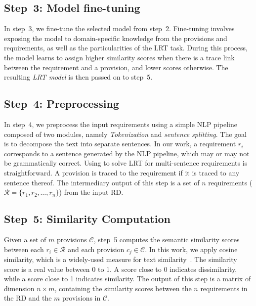 \subsection*{Step~3: Model fine-tuning } \label{sec:fine-tunning}
In step~3, we fine-tune the selected model from step~2. Fine-tuning involves exposing the model to domain-specific knowledge from the provisions and requirements, as well as the particularities of the LRT task. 
During this process, the model learns to assign higher similarity scores when there is a trace link between the requirement and a provision, and lower scores otherwise. 
The resulting \textit{LRT model} is then passed on to step~5.  


\subsection*{Step~4: Preprocessing } 
In  step~4, we preprocess the input requirements using a simple NLP pipeline composed of two modules, namely \textit{Tokenization} and \textit{sentence splitting}. The goal is to decompose the text into separate sentences. In our work, a requirement $r_i$ corresponds to a sentence generated by the NLP pipeline, which may or may not be grammatically correct. 
%
Using \kashif to solve LRT for multi-sentence requirements is straightforward. A provision is traced to the requirement if it is traced to any sentence thereof. The intermediary output of this step is a set of $n$ requirements ($\mathcal{R}=\{r_1, r_2, \ldots, r_n\}$) from the input RD. 

\subsection*{Step~5: Similarity Computation }  
Given a set of $m$ provisions $\mathcal{C}$, step~5 computes the semantic similarity scores between each $r_i\in\mathcal{R}$ and each provision $c_j\in\mathcal{C}$. In this work, we apply cosine similarity, which is a widely-used measure for text similarity~\cite{Jurafsky:20}. 
%
The similarity score is a real value between 0 to 1. A score close to 0 indicates dissimilarity, while a score close to 1 indicates similarity. %
The output of this step is a matrix of dimension $n \times m$, containing the similarity scores between the $n$ requirements in the RD and the $m$ provisions in $\mathcal{C}$. 


